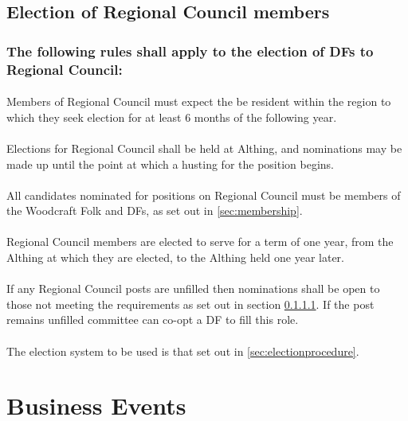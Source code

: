 \documentclass[a4paper, 12pt]{article}
\begin{document}
\subsection{Election of Regional Council members}
\subsubsection{The following rules shall apply to the election of DFs to Regional Council:}
\paragraph{}
\label{sec:regionalresidency}
Members of Regional Council must expect the be resident within the region to which they seek election for at least 6 months of the following year.
\paragraph{}
Elections for Regional Council shall be held at Althing, and nominations may be made up until the point at which a husting for the position begins.
\paragraph{}
All candidates nominated for positions on Regional Council must be members of the Woodcraft Folk and DFs, as set out in \ref{sec:membership}.
\paragraph{}
Regional Council members are elected to serve for a term of one year, from the Althing at which they are elected, to the Althing held one year later.
\paragraph{}
If any Regional Council posts are unfilled then nominations shall be open to those not meeting the requirements as set out in section \ref{sec:regionalresidency}. If the post remains unfilled committee can co-opt a DF to fill this role.
\paragraph{}
The election system to be used is that set out in \ref{sec:electionprocedure}.

\section{Business Events}
\label{sec:business}
\end{document}
